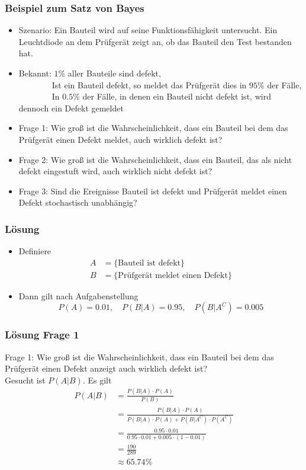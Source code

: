 \begin{frame}
\frametitle{Beispiel zum Satz von Bayes}
\begin{itemize}
\item Szenario: Ein Bauteil wird auf seine Funktionsfähigkeit untersucht. Ein Leuchtdiode an dem Prüfgerät zeigt an, ob das Bauteil den Test bestanden hat.
\pause
\item Bekannt: $1\%$ aller Bauteile sind defekt,\\
\pause
$\quad\quad\quad\quad$Ist ein Bauteil defekt, so meldet das Prüfgerät dies in $95\%$ der Fälle,\\
\pause
$\quad\quad\quad\quad$In $0.5\%$ der Fälle, in denen ein Bauteil nicht defekt ist, wird dennoch ein Defekt gemeldet
\pause
\item Frage 1: Wie groß ist die Wahrscheinlichkeit, dass ein Bauteil bei dem das Prüfgerät einen Defekt meldet, auch wirklich defekt ist?
\pause
\item Frage 2: Wie groß ist die Wahrscheinlichkeit, dass ein Bauteil, das als nicht defekt eingestuft wird, auch wirklich nicht defekt ist?
\pause
\item Frage 3: Sind die Ereignisse \glqq Bauteil ist defekt\grqq{} und \glqq Prüfgerät meldet einen Defekt\grqq{} stochastisch unabhängig?
\end{itemize}
\end{frame}
\begin{frame}
\frametitle{Lösung}
\begin{itemize}[<+->]
\item Definiere 
\begin{align*}
A &= \lbrace \text{Bauteil ist defekt}\rbrace \\
B &= \lbrace \text{Prüfgerät meldet einen Defekt}\rbrace
\end{align*}
\item Dann gilt nach Aufgabenstellung
\[ P(A) = 0.01, \quad P(B|A) = 0.95, \quad P(B|A^C) = 0.005\]
\end{itemize}
\end{frame}
\begin{frame}
\frametitle{Lösung Frage 1}
Frage 1: Wie groß ist die Wahrscheinlichkeit, dass ein Bauteil bei dem das Prüfgerät einen Defekt anzeigt auch wirklich defekt ist?\\
Gesucht ist $P(A|B)$. Es gilt \pause
\begin{align*}
P(A|B) 	&= \frac{P(B|A)\cdot P(A)}{P(B)} \\
		&= \frac{P(B|A)\cdot P(A)}{P(B|A)\cdot P(A) + P(B|A^C) \cdot P(A^C)}\\
		&= \frac{0.95 \cdot 0.01}{0.95 \cdot 0.01 + 0.005 \cdot (1-0.01)}\\
		&= \frac{190}{289}\\
		&\approx 65.74 \%
\end{align*}
\end{frame}
